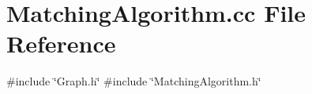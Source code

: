 \section{Matching\+Algorithm.\+cc File Reference}
\label{MatchingAlgorithm_8cc}
{\ttfamily \#include \char`\"{}Graph.\+h\char`\"{}}\newline
{\ttfamily \#include \char`\"{}Matching\+Algorithm.\+h\char`\"{}}\newline
